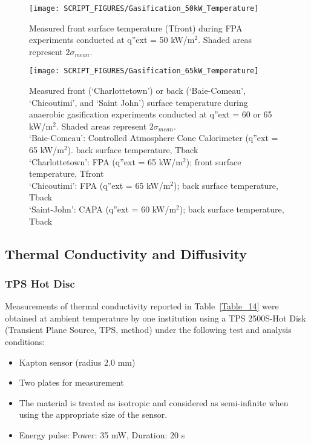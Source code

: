 \documentclass{book}
\begin{document}
\begin{figure}
  \centering
  \texttt{[image: SCRIPT\_FIGURES/Gasification\_50kW\_Temperature]}
  \caption{Measured front surface temperature (Tfront) during FPA experiments conducted at q”ext = 50 kW/m$^2$. Shaded areas represent $2\sigma_{mean}$.}
  \label{Fig:Gasification_50kW_Temperature}
\end{figure}

\begin{figure}
  \centering
  \texttt{[image: SCRIPT\_FIGURES/Gasification\_65kW\_Temperature]}
  \caption{Measured front (‘Charlottetown’) or back (‘Baie-Comeau’, ‘Chicoutimi’, and ‘Saint John’) surface temperature during anaerobic gasification experiments conducted at q”ext = 60 or 65 kW/m$^2$. Shaded areas represent $2\sigma_{mean}$. \\
 ‘Baie-Comeau’:  Controlled Atmosphere Cone Calorimeter (q”ext = 65 kW/m$^2$). back surface temperature, Tback \\
‘Charlottetown’:  FPA (q”ext = 65 kW/m$^2$); front surface temperature, Tfront \\
‘Chicoutimi’:   FPA (q”ext = 65 kW/m$^2$); back surface temperature, Tback \\
‘Saint-John’:   CAPA (q”ext = 60 kW/m$^2$); back surface temperature, Tback}
  \label{Fig:Gasification_65kW_Temperature}
\end{figure}


\subsection{Thermal Conductivity and Diffusivity}

\subsubsection{TPS Hot Disc}

Measurements of thermal conductivity reported in Table~\ref{Table_14} were obtained at ambient temperature by one institution using a TPS 2500S-Hot Disk (Transient Plane Source, TPS, method) under the following test and analysis conditions:
\begin{itemize}
 \item Kapton sensor (radius 2.0 mm)
 \item Two plates for measurement
 \item The material is treated as isotropic and considered as semi-infinite when using the appropriate size of the sensor.
 \item Energy pulse: Power: 35 mW, Duration: 20 s
\end{itemize}
\end{document}
